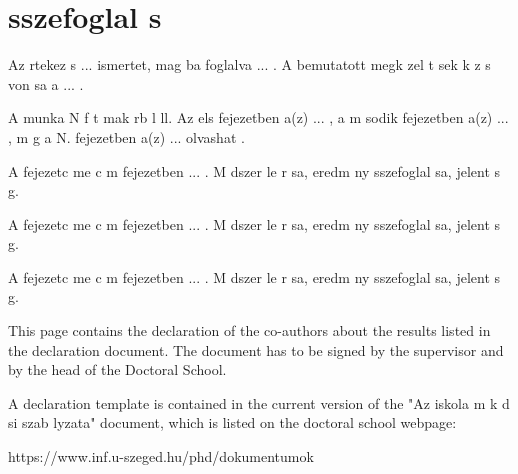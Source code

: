 \documentclass{article}
\begin{document}
\vspace*{1em}


\renewcommand{\refname}{\large Other References }
 

\makeatletter
\apptocmd{\thebibliography}{\global\c@NAT@ctr 10\relax}{}{}
\makeatother




\newpage

\section{ sszefoglal s}

Az  rtekez s ... ismertet, mag ba foglalva ... . A bemutatott megk zel t sek k z s von sa a ... .

A munka N f  t mak rb l  ll. Az els  fejezetben a(z) ... , a m sodik fejezetben a(z) ... , m g a N. fejezetben a(z) ... olvashat .

A fejezetc me c m  fejezetben ... . M dszer le r sa, eredm ny  sszefoglal sa, jelent s g.

A fejezetc me c m  fejezetben ... . M dszer le r sa, eredm ny  sszefoglal sa, jelent s g.

A fejezetc me c m  fejezetben ... . M dszer le r sa, eredm ny  sszefoglal sa, jelent s g.


\newpage


\newpage

This page contains the declaration of the co-authors about the results listed in the declaration document. The document has to be signed by the supervisor and by the head of the Doctoral School. 

A declaration template is contained in the current version of the "Az iskola m k d si szab lyzata" document, which is listed on the doctoral school webpage:

https://www.inf.u-szeged.hu/phd/dokumentumok


\newpage
\thispagestyle{empty}
\mbox{}
\newpage
\end{document}
